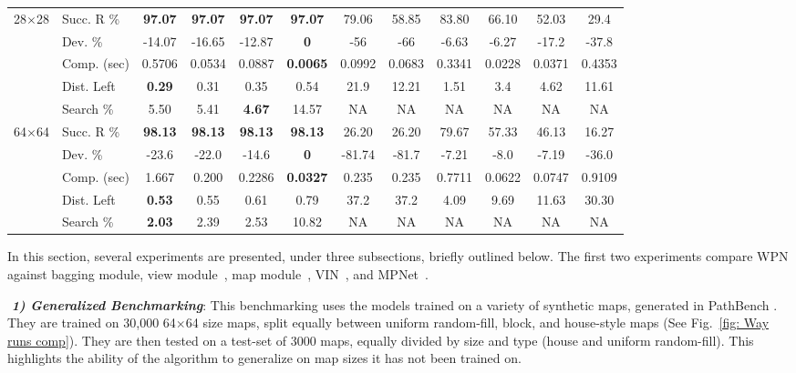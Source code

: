 \documentclass[journal, twocolumn]{IEEEtran}
\begin{document}
\begin{table*}[t]
{\begin{tabular}{ll|ccc|ccc|ccc|c}
        \multirow{3}{*}{28$\times$28} 
        & Succ. R \%  & \textbf{97.07}  & \textbf{97.07}  & \textbf{97.07} & \textbf{97.07} & 79.06  & 58.85  & 83.80  & 66.10 & 52.03 & 29.4 \\
        & Dev. \%   &  -14.07 & -16.65  & -12.87 & \textbf{0} & -56  & -66  & -6.63  & -6.27 & -17.2 & -37.8 \\
        & Comp. (sec) &  0.5706 & 0.0534  & 0.0887 & \textbf{0.0065} & 0.0992 & 0.0683 & 0.3341  & 0.0228 & 0.0371 & 0.4353 \\
        & Dist. Left  & \textbf{0.29} & 0.31  & 0.35 & 0.54 & 21.9  & 12.21  & 1.51  & 3.4 & 4.62 & 11.61 \\
        & Search \% & 5.50  & 5.41  & \textbf{4.67} & 14.57 & NA  & NA & NA & NA & NA & NA\\
        \midrule
        
        \multirow{3}{*}{64$\times$64} & Succ. R \%  & \textbf{98.13}& \textbf{98.13}  & \textbf{98.13} & \textbf{98.13} & 26.20  & 26.20  & 79.67  & 57.33 & 46.13 & 16.27 \\
        & Dev. \%   & -23.6  & -22.0  & -14.6 & \textbf{0} & -81.74  & -81.7  & -7.21  & -8.0 & -7.19 & -36.0\\
        & Comp. (sec)   & 1.667  & 0.200  & 0.2286 & \textbf{0.0327} & 0.235 & 0.235 & 0.7711  & 0.0622  & 0.0747 & 0.9109 \\
        & Dist. Left  & \textbf{0.53}  & 0.55  & 0.61 & 0.79 & 37.2  & 37.2  & 4.09  & 9.69 & 11.63 & 30.30 \\
        & Search \% & \textbf{2.03}  & 2.39  & 2.53 & 10.82 & NA & NA  & NA  & NA & NA & NA\\
        \bottomrule
    \end{tabular}}
    \label{tab:specific}
    \small
\end{table*}



In this section, several experiments are presented, under three subsections, briefly outlined below. The first two experiments compare WPN against bagging module, 
view module~\cite{nicola2018lstm}, 
map module~\cite{inoue2019robot},  
VIN~\cite{tamar2016value}, and MPNet~\cite{qureshi2019motion}.\par

\noindent\emph{\bf\,\,1) Generalized Benchmarking}: This benchmarking uses the models trained on a variety of synthetic maps, generated in PathBench \cite{pathbench}. They are trained on 30,000 64$\times$64 size maps, split equally between uniform random-fill, block, and house-style maps (See Fig.~\ref{fig: Way runs comp}). They are then tested on a test-set of 3000 maps, equally divided by size and type (house and uniform random-fill). This highlights the ability of the algorithm to generalize on map sizes it has not been trained on. \par
\end{document}
